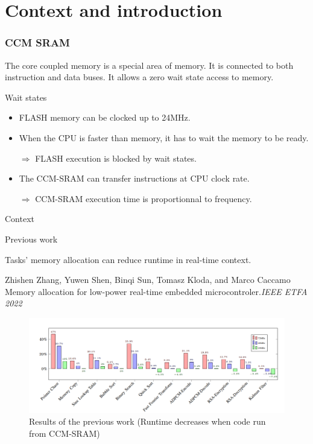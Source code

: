 \documentclass[
	11pt, %
]{beamer}
\begin{document}
\section{Context and introduction}

\begin{frame}
    \frametitle{CCM SRAM}
	\begin{center}
		
	\end{center}
    The core coupled memory is a special area of memory. 
    It is connected to both instruction and data buses.
    It allows a zero wait state access to memory. 
\end{frame}

\begin{frame}{Wait states}
	\begin{itemize}
	\item FLASH memory can be clocked up to 24MHz.
	\item When the CPU is faster than memory, it has to wait the memory to be ready.
	
	$\Rightarrow$ FLASH execution is blocked by wait states. 
	\item The CCM-SRAM can transfer instructions at CPU clock rate.
	
	$\Rightarrow$ CCM-SRAM execution time is proportionnal to frequency. 
	\end{itemize} 
\end{frame}

\begin{frame}{Context}
	\begin{block}{Previous work}


		
		Tasks' memory allocation can reduce runtime in real-time context.
			\begin{thebibliography}{10}
				{\tiny
				\bibitem{} Zhishen Zhang, Yuwen Shen, Binqi Sun, Tomasz Kloda, and Marco Caccamo
				\newblock Memory allocation for low-power real-time embedded microcontroler.{\em{IEEE ETFA 2022}}
				}
			\end{thebibliography}
	\end{block}
	\begin{figure}
		\centering
		\includegraphics[scale=0.5]{images/boost.png}
		\caption{Results of the previous work (Runtime decreases when code run from CCM-SRAM)}
	\end{figure}
\end{frame}
\end{document}
